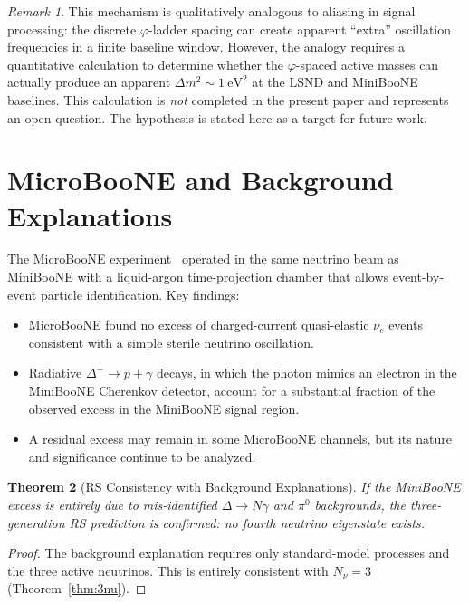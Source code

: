 \documentclass[12pt,a4paper]{article}
\newtheorem{theorem}{Theorem}[section]
\theoremstyle{definition}
\theoremstyle{remark}
\newtheorem{remark}[theorem]{Remark}
\begin{document}
\begin{remark}
This mechanism is qualitatively analogous to aliasing in signal
processing: the discrete $\varphi$-ladder spacing can create apparent
``extra'' oscillation frequencies in a finite baseline window.  However,
the analogy requires a quantitative calculation to determine whether the
$\varphi$-spaced active masses can actually produce an apparent
$\Delta m^2 \sim 1~\mathrm{eV}^2$ at the LSND and MiniBooNE baselines.
This calculation is \emph{not} completed in the present paper and
represents an open question.  The hypothesis is stated here as a
target for future work.
\end{remark}

\section{MicroBooNE and Background Explanations}
\label{sec:microboone}

The MicroBooNE experiment~\cite{MicroBooNE2021} operated in the same
neutrino beam as MiniBooNE with a liquid-argon time-projection chamber
that allows event-by-event particle identification.  Key findings:

\begin{itemize}
  \item MicroBooNE found no excess of charged-current quasi-elastic
  $\nu_e$ events consistent with a simple sterile neutrino oscillation.
  \item Radiative $\Delta^+ \to p + \gamma$ decays, in which the photon
  mimics an electron in the MiniBooNE Cherenkov detector, account for
  a substantial fraction of the observed excess in the MiniBooNE signal
  region.
  \item A residual excess may remain in some MicroBooNE channels, but
  its nature and significance continue to be analyzed.
\end{itemize}

\begin{theorem}[RS Consistency with Background Explanations]
\label{thm:bg-ok}
If the MiniBooNE excess is entirely due to mis-identified
$\Delta \to N\gamma$ and $\pi^0$ backgrounds, the three-generation RS
prediction is confirmed: no fourth neutrino eigenstate exists.
\end{theorem}

\begin{proof}
The background explanation requires only standard-model processes and
the three active neutrinos.  This is entirely consistent with
$N_\nu = 3$ (Theorem~\ref{thm:3nu}).
\end{proof}
\end{document}
